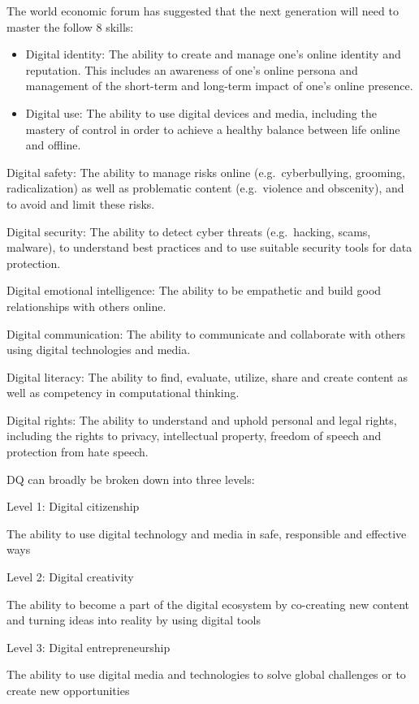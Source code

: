 \documentclass[]{book}
\begin{document}
The world economic forum has suggested that the next generation will need to master the follow 8 skills: \citep{WEF2016}

\begin{itemize}
\item
  Digital identity: The ability to create and manage one's online identity and reputation. This includes an awareness of one's online persona and management of the short-term and long-term impact of one's online presence.
\item
  Digital use: The ability to use digital devices and media, including the mastery of control in order to achieve a healthy balance between life online and offline.
\end{itemize}

Digital safety: The ability to manage risks online (e.g.~cyberbullying, grooming, radicalization) as well as problematic content (e.g.~violence and obscenity), and to avoid and limit these risks.

Digital security: The ability to detect cyber threats (e.g.~hacking, scams, malware), to understand best practices and to use suitable security tools for data protection.

Digital emotional intelligence: The ability to be empathetic and build good relationships with others online.

Digital communication: The ability to communicate and collaborate with others using digital technologies and media.

Digital literacy: The ability to find, evaluate, utilize, share and create content as well as competency in computational thinking.

Digital rights: The ability to understand and uphold personal and legal rights, including the rights to privacy, intellectual property, freedom of speech and protection from hate speech.

DQ can broadly be broken down into three levels:

Level 1: Digital citizenship

The ability to use digital technology and media in safe, responsible and effective ways

Level 2: Digital creativity

The ability to become a part of the digital ecosystem by co-creating new content and turning ideas into reality by using digital tools

Level 3: Digital entrepreneurship

The ability to use digital media and technologies to solve global challenges or to create new opportunities
\end{document}
